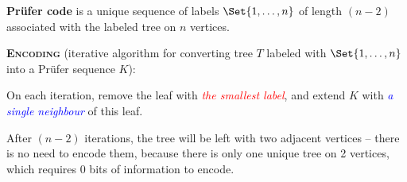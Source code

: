 \documentclass[a4paper,10pt]{article}
\begin{document}
\begin{terms}
    \item \textbf{Pr\"{u}fer code} is a unique sequence of labels $\Set{1,\dotsc,n}$ of length $(n-2)$ associated with the labeled tree on $n$ vertices.
    \begin{terms}
        \item \textbf{\textsc{Encoding}} (iterative algorithm for converting tree $T$ labeled with $\Set{1,\dotsc,n}$ into a Pr\"{u}fer sequence $K$):
        \begin{terms}
            \item On each iteration, remove the leaf with \textcolor{red}{\emph{the smallest label}}, and extend $K$ with \textcolor{blue}{\emph{a single neighbour}} of this leaf.
            \item After $(n-2)$ iterations, the tree will be left with two adjacent vertices \--- there is no need to encode them, because there is only one unique tree on 2 vertices, which requires 0 bits of information to encode.
        \end{terms}

        \begingroup
        \def\Dist{.5}
        \def\LabelY{-0.9}


\end{terms}
\end{terms}
\end{document}

